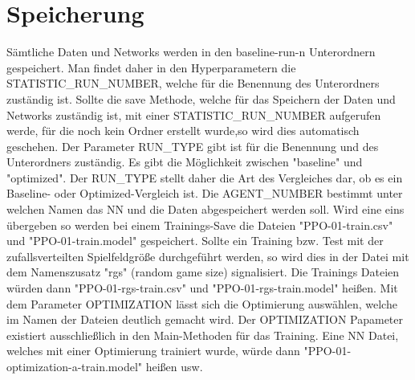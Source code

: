 \section{Speicherung}
Sämtliche Daten und Networks werden in den baseline-run-n Unterordnern gespeichert. Man findet daher in den Hyperparametern die STATISTIC\_RUN\_NUMBER, welche für die Benennung des Unterordners zuständig ist. Sollte die save Methode, welche für das Speichern der Daten und Networks zuständig ist, mit einer STATISTIC\_RUN\_NUMBER aufgerufen werde, für die noch kein Ordner erstellt wurde,so wird dies automatisch geschehen. Der Parameter RUN\_TYPE gibt ist für die Benennung und des Unterordners zuständig. Es gibt die Möglichkeit zwischen "baseline" und "optimized". Der RUN\_TYPE stellt daher die Art des Vergleiches dar, ob es ein Baseline- oder Optimized-Vergleich ist. Die AGENT\_NUMBER bestimmt unter welchen Namen das NN und die Daten abgespeichert werden soll. Wird eine eins übergeben so werden bei einem Trainings-Save die Dateien "PPO-01-train.csv" und "PPO-01-train.model" gespeichert. Sollte ein Training bzw. Test mit der zufallsverteilten Spielfeldgröße durchgeführt werden, so wird dies in der Datei mit dem Namenszusatz "rgs" (random game size) signalisiert. Die Trainings Dateien würden dann "PPO-01-rgs-train.csv" und "PPO-01-rgs-train.model" heißen. Mit dem Parameter OPTIMIZATION lässt sich die Optimierung auswählen, welche im Namen der Dateien deutlich gemacht wird. Der OPTIMIZATION Papameter existiert ausschließlich in den Main-Methoden für das Training. Eine NN Datei, welches mit einer Optimierung trainiert wurde, würde dann "PPO-01-optimization-a-train.model" heißen usw.

